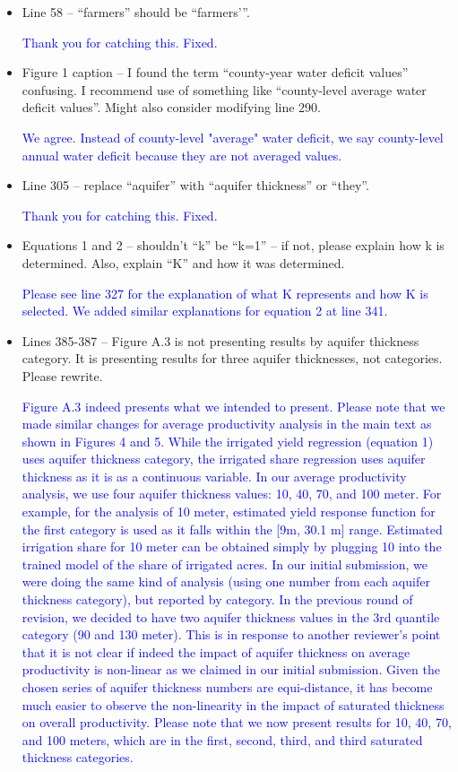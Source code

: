 \documentclass[
]{article}
\begin{document}
\begin{itemize}
    \item Line 58 – ``farmers'' should be ``farmers’''.

\textcolor{blue}{Thank you for catching this. Fixed.}

\item Figure 1 caption – I found the term ``county-year water deficit values'' confusing. I recommend use of something like ``county-level average water deficit values''. Might also consider modifying line 290.

\textcolor{blue}{We agree. Instead of county-level "average" water deficit, we say county-level annual water deficit because they are not averaged values.}

\item Line 305 – replace ``aquifer'' with ``aquifer thickness'' or ``they''.

\textcolor{blue}{Thank you for catching this. Fixed.}

\item Equations 1 and 2 – shouldn’t ``k'' be ``k=1'' – if not, please explain how k is determined. Also, explain ``K'' and how it was determined.

\textcolor{blue}{Please see line 327 for the explanation of what K represents and how K is selected. We added similar explanations for equation 2 at line 341.}

\item Lines 385-387 – Figure A.3 is not presenting results by aquifer thickness category. It is presenting results for three aquifer thicknesses, not categories. Please rewrite.

\textcolor{blue}{Figure A.3 indeed presents what we intended to present. Please note that we made similar changes for average productivity analysis in the main text as shown in Figures 4 and 5. While the irrigated yield regression (equation 1) uses aquifer thickness category, the irrigated share regression uses aquifer thickness as it is as a continuous variable. In our average productivity analysis, we use four aquifer thickness values: 10, 40, 70, and 100 meter. For example, for the analysis of 10 meter, estimated yield response function for the first category is used as it falls within the [9m, 30.1 m] range. Estimated irrigation share for 10 meter can be obtained simply by plugging 10 into the trained model of the share of irrigated acres. In our initial submission, we were doing the same kind of analysis (using one number from each aquifer thickness category), but reported by category. In the previous round of revision, we decided to have two aquifer thickness values in the 3rd quantile category (90 and 130 meter). This is in response to another reviewer's point that it is not clear if indeed the impact of aquifer thickness on average productivity is non-linear as we claimed in our initial submission. Given the chosen series of aquifer thickness numbers are equi-distance, it has become much easier to observe the non-linearity in the impact of saturated thickness on overall productivity. Please note that we now present results for 10, 40, 70, and 100 meters, which are in the first, second, third, and third saturated thickness categories. }


\end{itemize}
\end{document}
